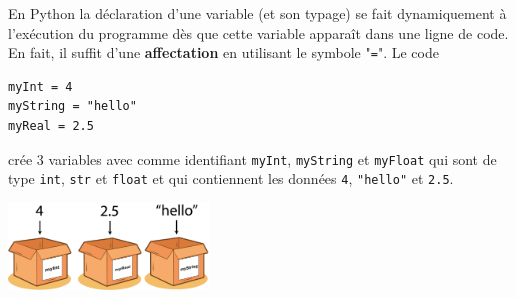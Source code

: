 \documentclass[11pt, a4paper]{book}
\begin{document}
En Python la déclaration d’une variable (et son typage) se fait dynamiquement à l’exécution du programme dès que cette variable apparaît dans une ligne de code. En fait, il suffit d'une \textbf{affectation} en utilisant le symbole "\lstinline{=}". Le code
\begin{lstlisting}[numbers=none]
myInt = 4
myString = "hello"
myReal = 2.5
\end{lstlisting}
crée 3 variables avec comme identifiant \lstinline{myInt}, \lstinline{myString} et \lstinline{myFloat} qui sont de type \lstinline{int}, \lstinline{str} et \lstinline{float} et qui contiennent les données \lstinline{4}, \lstinline{"hello"} et \lstinline{2.5}. 
\begin{center}
	\includegraphics[trim=0 0 0 45,width=0.4\textwidth]{images/variables/variables2}
\end{center}
\end{document}
